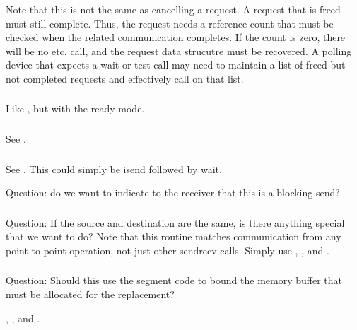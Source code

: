 \documentclass{article}
\begin{document}
Note that this is not the same as cancelling a request.  
A request that is freed must still complete.  Thus, the request needs
a reference count that must be checked when the related communication
completes.  If the count is zero, there will be no 
etc. call, and the request data strucutre must be recovered.  A
polling device that expects a wait or test call may need to maintain a
list of freed but not completed requests and effectively call
 on that list.

\subsubsection{}
Like , but with the ready mode.

\subsubsection{}
See .

\subsubsection{}
See .  This could simply be isend followed by wait.

Question: do we want to indicate to the receiver that this is a
blocking send?

\subsubsection{}
Question: If the source and destination are the same, is there anything
special that we want to do?  Note that this routine matches communication from
any point-to-point operation, not just other sendrecv calls.  
Simply use , , and
. 

\subsubsection{}
Question: Should this use the segment code to bound the memory buffer that
must be allocated for the replacement?
\begin{adi3}
, , and
. 
\end{adi3}
\end{document}

